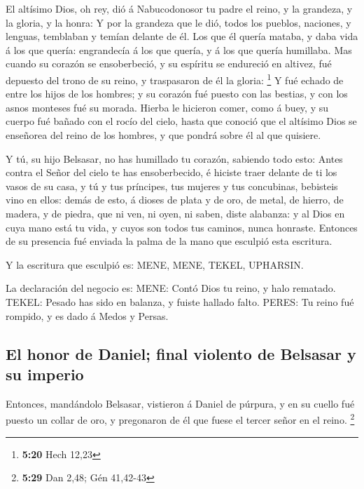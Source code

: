  El altísimo Dios, oh rey, dió á Nabucodonosor tu padre el
reino, y la grandeza, y la gloria, y la honra:  Y por la
grandeza que le dió, todos los pueblos, naciones, y lenguas, temblaban y
temían delante de él. Los que él quería mataba, y daba vida á los que
quería: engrandecía á los que quería, y á los que quería humillaba.
 Mas cuando su corazón se ensoberbeció, y su espíritu se
endureció en altivez, fué depuesto del trono de su reino, y traspasaron
de él la gloria: \footnote{\textbf{5:20} Hech 12,23}  Y fué
echado de entre los hijos de los hombres; y su corazón fué puesto con
las bestias, y con los asnos monteses fué su morada. Hierba le hicieron
comer, como á buey, y su cuerpo fué bañado con el rocío del cielo, hasta
que conoció que el altísimo Dios se enseñorea del reino de los hombres,
y que pondrá sobre él al que quisiere.

 Y tú, su hijo Belsasar, no has humillado tu corazón,
sabiendo todo esto:  Antes contra el Señor del cielo te has
ensoberbecido, é hiciste traer delante de ti los vasos de su casa, y tú
y tus príncipes, tus mujeres y tus concubinas, bebisteis vino en ellos:
demás de esto, á dioses de plata y de oro, de metal, de hierro, de
madera, y de piedra, que ni ven, ni oyen, ni saben, diste alabanza: y al
Dios en cuya mano está tu vida, y cuyos son todos tus caminos, nunca
honraste.  Entonces de su presencia fué enviada la palma de
la mano que esculpió esta escritura.

 Y la escritura que esculpió es: MENE, MENE, TEKEL,
UPHARSIN.

 La declaración del negocio es: MENE: Contó Dios tu reino,
y halo rematado.  TEKEL: Pesado has sido en balanza, y
fuiste hallado falto.  PERES: Tu reino fué rompido, y es
dado á Medos y Persas.

\hypertarget{el-honor-de-daniel-final-violento-de-belsasar-y-su-imperio}{%
\subsection{El honor de Daniel; final violento de Belsasar y su
imperio}\label{el-honor-de-daniel-final-violento-de-belsasar-y-su-imperio}}

 Entonces, mandándolo Belsasar, vistieron á Daniel de
púrpura, y en su cuello fué puesto un collar de oro, y pregonaron de él
que fuese el tercer señor en el reino. \footnote{\textbf{5:29} Dan 2,48;
  Gén 41,42-43}

